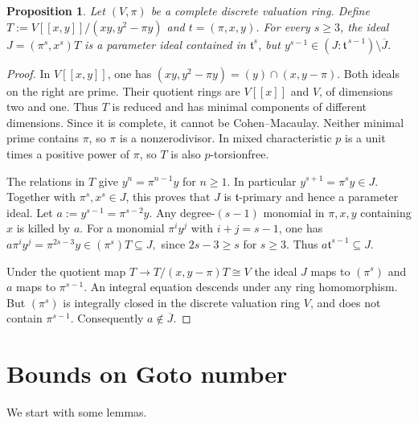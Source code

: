 \documentclass[11pt,a4paper]{amsart}
\numberwithin{equation}{section}
\newtheorem{proposition}[theorem]{Proposition}
\newcommand{\ol}[1]{\overline{#1}}
\begin{document}
 \begin{proposition}
 	\label{prop:noncm}
 	Let  $(V,\pi)$ be a complete discrete valuation ring.  Define
 	$ T:=V[[x,y]]/(xy,y^2-\pi y)$ and $ t=(\pi,x,y)$.
 	For every $s\geq3$, the ideal
 	$ J=(\pi^s,x^s)T $
 	is a parameter ideal contained in $\mathfrak t^s$, but
 	$ y^{s-1}\in (J:\mathfrak t^{\,s-1})\setminus \ol J.$
 	
 \end{proposition}
 \begin{proof}
 	In $V[[x,y]]$, one has
 	$ (xy,y^2-\pi y)=(y)\cap(x,y-\pi). $
 	Both ideals on the right are prime.  Their quotient rings
 	are $V[[x]]$ and $V$, of dimensions two and one.
 	Thus $T$ is reduced and has minimal components of different
 	dimensions.  Since it is complete, it cannot be
 	Cohen--Macaulay.  Neither minimal prime contains $\pi$,
 	so $\pi$ is a nonzerodivisor.  In mixed characteristic
 	$p$ is a unit times a positive power of $\pi$, so $T$ is
 	also $p$-torsionfree.
 	
 	The relations in $T$ give $y^n=\pi^{n-1}y$ for $n\geq1$.
 	In particular $y^{s+1}=\pi^sy\in J$.
 	Together with $\pi^s,x^s\in J$, this proves that
 	$J$ is $\mathfrak t$-primary and hence a parameter ideal.
 	Let $a:=y^{s-1}=\pi^{s-2}y$.  Any degree-$(s-1)$
 	monomial in $\pi,x,y$ containing $x$ is killed by $a$.
 	For a monomial $\pi^iy^j$ with $i+j=s-1$, one has
 	$ 	a\pi^iy^j=\pi^{2s-3}y\in(\pi^s)T\subseteq J, $
 	since $2s-3\geq s$ for $s\geq3$.
 	Thus $a\mathfrak t^{s-1}\subseteq J$.
 	
 	Under the quotient map
 	$ 	T\to T/(x,y-\pi)T\cong V $
 	the ideal $J$ maps to $(\pi^s)$ and $a$ maps to $\pi^{s-1}$.
 	An integral equation descends under any ring homomorphism.
 	But $(\pi^s)$ is integrally closed in the discrete valuation
 	ring $V$, and does not contain $\pi^{s-1}$.
 	Consequently $a\notin\ol J$.
 \end{proof}
 
 \section{Bounds on Goto number}
 
  We start with some lemmas.
  
\end{document}
